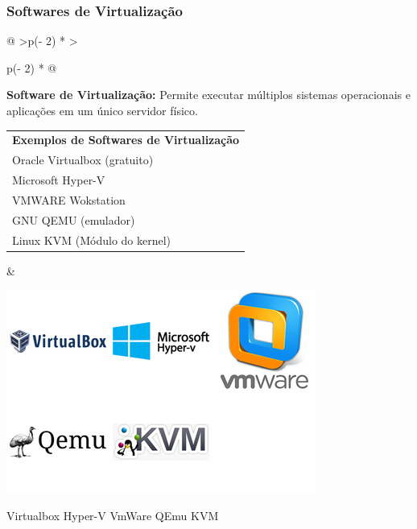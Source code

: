 \documentclass[
]{book}
\begin{document}
\subsubsection{Softwares de Virtualização}\label{softwares-de-virtualizauxe7uxe3o}

\begin{longtable}[]{@{}
  >{\centering\arraybackslash}p{(\columnwidth - 2\tabcolsep) * }
  >{\raggedright\arraybackslash}p{(\columnwidth - 2\tabcolsep) * }@{}}
\toprule\noalign{}
\endhead
\bottomrule\noalign{}
\endlastfoot
\begin{minipage}[t]{\linewidth}\centering
\textbf{Software de Virtualização:} Permite executar múltiplos sistemas operacionais e aplicações em um único servidor físico.

\begin{longtable}[]{@{}l@{}}
\toprule\noalign{}
\endhead
\bottomrule\noalign{}
\endlastfoot
\textbf{Exemplos de Softwares de Virtualização} \\
Oracle Virtualbox (gratuito) \\
Microsoft Hyper-V \\
VMWARE Wokstation \\
GNU QEMU (emulador) \\
Linux KVM (Módulo do kernel) \\
\end{longtable}
\end{minipage} & \begin{minipage}[t]{\linewidth}\raggedright
\begin{center}
\includegraphics{images/InfraEstrutura/virtualização/virtualizacao.jpg}

Virtualbox Hyper-V VmWare QEmu KVM
\end{center}
\end{minipage} \\
\end{longtable}
\end{document}
